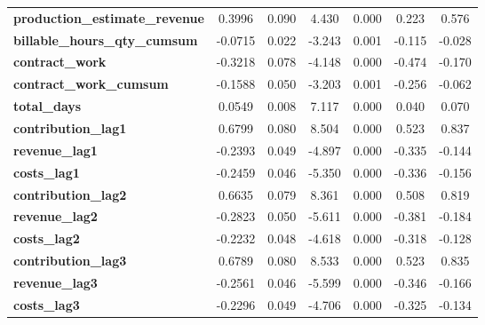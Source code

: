 \begin{center}
\begin{tabular}{lcccccc}
\textbf{production\_estimate\_revenue} &       0.3996  &        0.090     &     4.430  &         0.000        &        0.223    &        0.576     \\
\textbf{billable\_hours\_qty\_cumsum}  &      -0.0715  &        0.022     &    -3.243  &         0.001        &       -0.115    &       -0.028     \\
\textbf{contract\_work}                &      -0.3218  &        0.078     &    -4.148  &         0.000        &       -0.474    &       -0.170     \\
\textbf{contract\_work\_cumsum}        &      -0.1588  &        0.050     &    -3.203  &         0.001        &       -0.256    &       -0.062     \\
\textbf{total\_days}                   &       0.0549  &        0.008     &     7.117  &         0.000        &        0.040    &        0.070     \\
\textbf{contribution\_lag1}            &       0.6799  &        0.080     &     8.504  &         0.000        &        0.523    &        0.837     \\
\textbf{revenue\_lag1}                 &      -0.2393  &        0.049     &    -4.897  &         0.000        &       -0.335    &       -0.144     \\
\textbf{costs\_lag1}                   &      -0.2459  &        0.046     &    -5.350  &         0.000        &       -0.336    &       -0.156     \\
\textbf{contribution\_lag2}            &       0.6635  &        0.079     &     8.361  &         0.000        &        0.508    &        0.819     \\
\textbf{revenue\_lag2}                 &      -0.2823  &        0.050     &    -5.611  &         0.000        &       -0.381    &       -0.184     \\
\textbf{costs\_lag2}                   &      -0.2232  &        0.048     &    -4.618  &         0.000        &       -0.318    &       -0.128     \\
\textbf{contribution\_lag3}            &       0.6789  &        0.080     &     8.533  &         0.000        &        0.523    &        0.835     \\
\textbf{revenue\_lag3}                 &      -0.2561  &        0.046     &    -5.599  &         0.000        &       -0.346    &       -0.166     \\
\textbf{costs\_lag3}                   &      -0.2296  &        0.049     &    -4.706  &         0.000        &       -0.325    &       -0.134     \\

\end{tabular}
\end{center}
